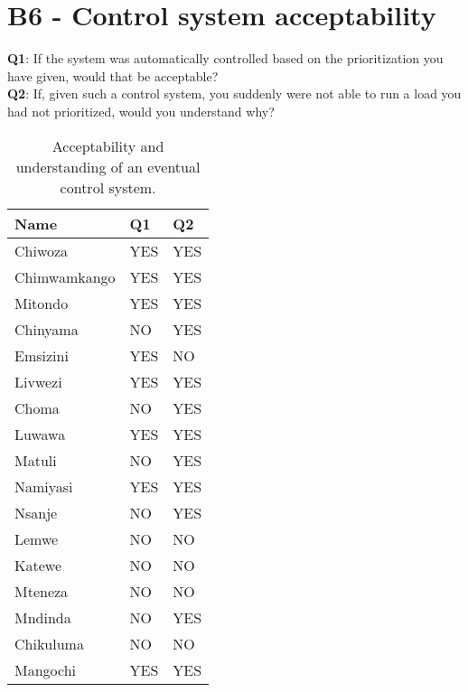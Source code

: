 \newpage
\section*{\large{B6 - Control system acceptability}}\label{seq:acceptability}
\vspace*{1cm}

\textbf{Q1}: If the system was automatically controlled based on the prioritization you have given, would that be acceptable?\\

\noindent\textbf{Q2}: If, given such a control system, you suddenly were not able to run a load you had not prioritized, would you understand why?\\

\begin{table}[ht!]
\centering
    \begin{tabular}{ m{4cm} m{2.5cm} m{2.5cm}} 
    \toprule
    \toprule
    \textbf{Name} & \textbf{Q1} & \textbf{Q2}\\
    \midrule
    Chiwoza         & YES & YES  \\
    Chimwamkango    & YES & YES  \\
    Mitondo         & YES & YES  \\
    Chinyama        & NO & YES  \\
    Emsizini        & YES & NO  \\
    Livwezi         & YES & YES  \\
    Choma           & NO & YES  \\
    Luwawa          & YES & YES  \\
    Matuli          & NO & YES  \\
    Namiyasi        & YES & YES  \\
    Nsanje          & NO & YES  \\
    Lemwe           & NO & NO  \\
    Katewe          & NO & NO  \\
    Mteneza         & NO & NO  \\
    Mndinda         & NO & YES  \\
    Chikuluma       & NO & NO  \\
    Mangochi        & YES & YES  \\
    
    \bottomrule
    \bottomrule
    \end{tabular}
\caption[User survey- control acceptability and understanding ]{Acceptability and understanding of an eventual control system.}
\end{table}

